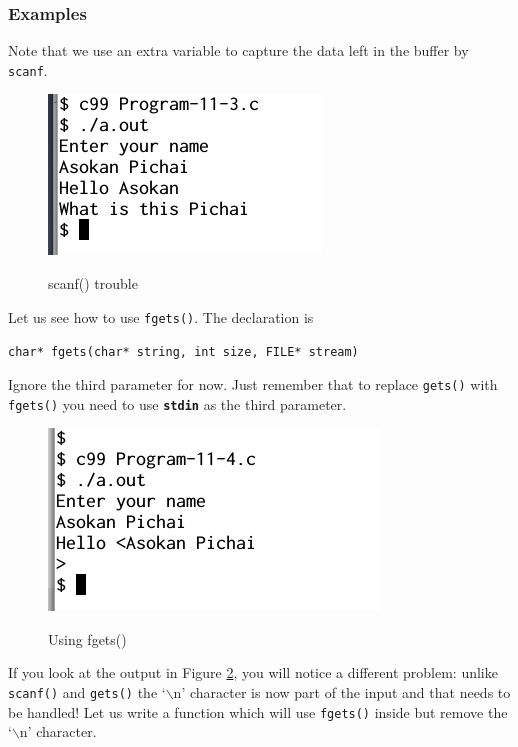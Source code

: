 \documentclass[11pt,a4paper]{article}
\begin{document}
\subsubsection*{Examples}

Note that we use an extra variable to capture the data left in the buffer by \texttt{scanf}. 

\begin{figure}[ht]

\begin{center}
\includegraphics[scale=0.6]{Output-11-3.png}
\label{output-11-3}
\caption{scanf() trouble}
\end{center}
\end{figure}

Let us see how to use \texttt{fgets()}. The declaration is 

\lstinline!char* fgets(char* string, int size, FILE* stream)! 

Ignore the third parameter for now. Just remember that to replace \texttt{gets()} with \texttt{fgets()} you need to use \textbf{\texttt{stdin}} as the third parameter.


\begin{figure}[ht]
\begin{center}
\includegraphics[scale=0.6]{Output-11-4.png}
\label{output-11-4}
\caption{Using fgets()}
\end{center}
\end{figure}

If you look at the output in Figure \ref{output-11-4}, you will notice a different problem: unlike \texttt{scanf()} and \texttt{gets()} the `$\backslash$n' character is now part of the input and that needs to be handled! Let us write a function which will use \texttt{fgets()} inside but remove the `$\backslash$n' character.
\end{document}
